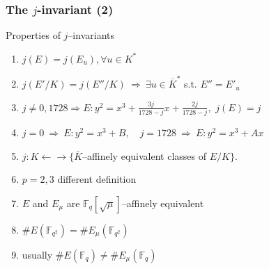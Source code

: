 \documentclass[12pt,handout]{beamer} %
\newcommand{\F}{\mathbb F}
\theoremstyle{definition}
\begin{document}
\begin{frame}
\frametitle{The $j$-invariant (2)}


\begin{beamerboxesrounded}[upper=block title example,lower=block body alerted,shadow=true]{Properties of
$j$--invariants}
\begin{enumerate}[<+-| alert@+>]
  \item $j(E)=j(E_u), \forall u\in K^*$
  \item $j(E'/K)=j(E''/K)\ \Rightarrow\ \exists u\in\overline{K}^*$ s.t. $E''=E'_u$
  \item $j\ne 0,1728\Rightarrow E: y^2=x^3+\frac{3j}{1728-j}x+\frac{2j}{1728-j},$ $j(E)=j$
  \item $j=0\ \Rightarrow\ E: y^2=x^3+B,\quad j=1728\ \Rightarrow\ E: y^2=x^3+Ax$
  \item $j: K\leftarrow\!\rightarrow\{\bar{K}$--affinely
  equivalent classes of $E/K\}$.
  \item $p=2, 3$ different definition
 \item $E$ and $E_\mu$ are $\F_q[\sqrt{\mu}]$--affinely equivalent
  \item $\#E(\F_{q^2})=\#E_\mu(\F_{q^2})$
  \item usually $\#E(\F_{q})\neq\#E_\mu(\F_{q})$
  \end{enumerate}
\end{beamerboxesrounded}
\end{frame}
\end{document}
